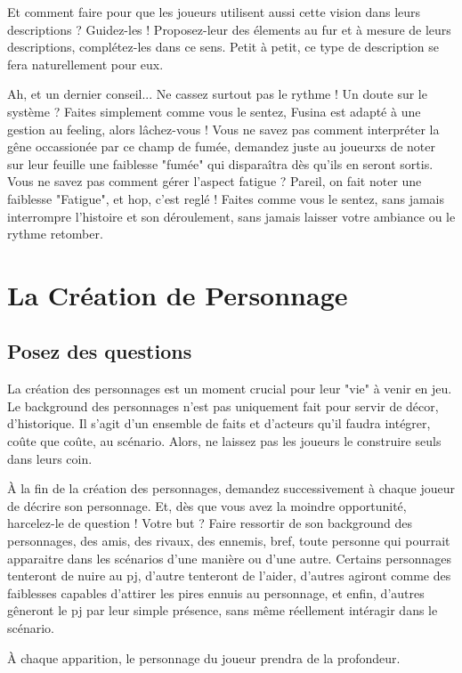 \begin{multicols}{2}
Et comment faire pour que les joueurs utilisent aussi cette vision dans leurs descriptions ? Guidez-les ! Proposez-leur des élements au fur et à mesure de leurs descriptions, complétez-les dans ce sens. Petit à petit, ce type de description se fera naturellement pour eux. 

Ah, et un dernier conseil... Ne cassez surtout pas le rythme ! Un doute sur le système ? Faites simplement comme vous le sentez, Fusina est adapté à une gestion au feeling, alors lâchez-vous ! Vous ne savez pas comment interpréter la gêne occassionée par ce champ de fumée, demandez juste au joueurxs de noter sur leur feuille une faiblesse "fumée" qui disparaîtra dès qu'ils en seront sortis. Vous ne savez pas comment gérer l'aspect fatigue ? Pareil, on fait noter une faiblesse "Fatigue", et hop, c'est reglé ! Faites comme vous le sentez, sans jamais interrompre l'histoire et son déroulement, sans jamais laisser votre ambiance ou le rythme retomber.

\section{La Création de Personnage}

\subsection{Posez des questions}

La création des personnages est un moment crucial pour leur "vie" à venir en jeu. Le background des personnages n'est pas uniquement fait pour servir de décor, d'historique. Il s'agit d'un ensemble de faits et d'acteurs qu'il faudra intégrer, coûte que coûte, au scénario. Alors, ne laissez pas les joueurs le construire seuls dans leurs coin.

À la fin de la création des personnages, demandez successivement à chaque joueur de décrire son personnage. Et, dès que vous avez la moindre opportunité, harcelez-le de question ! Votre but ? Faire ressortir de son background des personnages, des amis, des rivaux, des ennemis, bref, toute personne qui pourrait apparaitre dans les scénarios d'une manière ou d'une autre. Certains personnages tenteront de nuire au pj, d'autre tenteront de l'aider, d'autres agiront comme des faiblesses capables d'attirer les pires ennuis au personnage, et enfin, d'autres gêneront le pj par leur simple présence, sans même réellement intéragir dans le scénario. 

À chaque apparition, le personnage du joueur prendra de la profondeur.


\end{multicols}

